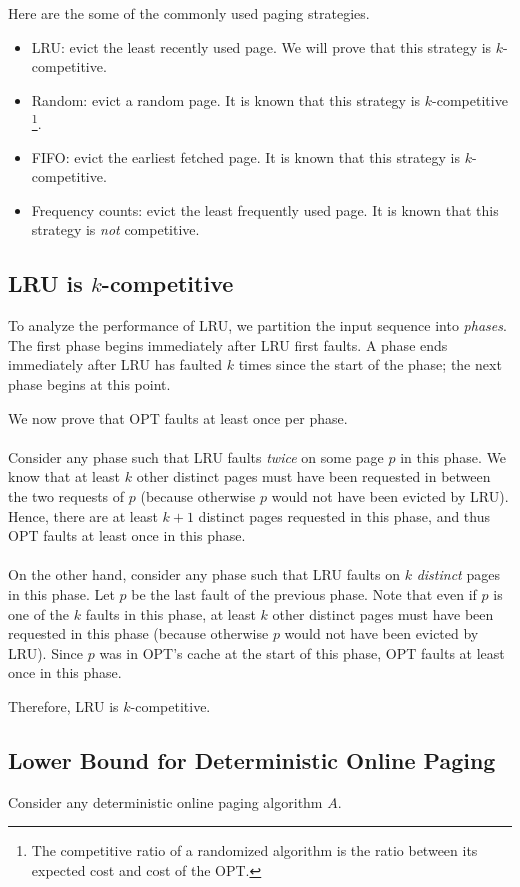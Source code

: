 \documentclass{article}
\begin{document}
Here are the some of the commonly used paging strategies.
\begin{itemize}
\item
LRU: evict the least recently used page. 
We will prove that this strategy is $k$-competitive.
\item
Random: evict a random page.
It is known that this strategy is $k$-competitive \footnote{The competitive ratio of a randomized algorithm is the ratio between its expected cost and cost of the OPT.}.
\item
FIFO: evict the earliest fetched page.
It is known that this strategy is $k$-competitive.
\item
Frequency counts: evict the least frequently used page.
It is known that this strategy is \emph{not} competitive.
\end{itemize}

\subsection{LRU is $k$-competitive}
To analyze the performance of LRU, we partition the input sequence
into \emph{phases}.
The first phase begins immediately after LRU first faults.
A phase ends immediately after LRU has faulted $k$
times since the start of the phase; the next phase begins at this
point.

We now prove that OPT faults at least once per phase.\\
\\
Consider any phase such that LRU faults \emph{twice} on some page $p$ in this phase. We know that at least $k$ other distinct pages must have been
requested in between the two requests of $p$ (because otherwise $p$
would not have been evicted by LRU).
Hence, there are at least $k+1$ distinct pages requested in this phase,
and thus OPT faults at least once in this phase.
\\\\
On the other hand, consider any phase such that LRU faults on $k$
\emph{distinct} pages in this phase.
Let $p$ be the last fault of the previous phase.
Note that even if $p$ is one of the $k$ faults in this phase, 
at least $k$ other distinct pages must have been requested in
this phase (because otherwise $p$ would not have been evicted by LRU).
Since $p$ was in OPT's cache at the start of this phase, OPT faults at
least once in this phase.

Therefore, LRU is $k$-competitive.

\subsection{Lower Bound for Deterministic Online Paging}
Consider any deterministic online paging algorithm $A$.
\end{document}
